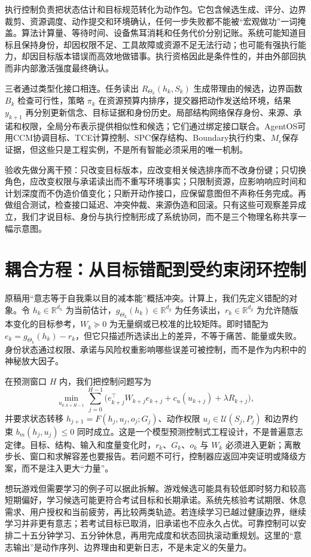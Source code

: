 执行控制负责把状态估计和目标规范转化为动作包。它包含候选生成、评分、边界裁剪、资源调度、动作提交和环境确认，任何一步失败都不能被“宏观做功”一词掩盖。算法计算量、等待时间、设备焦耳消耗和任务代价分别记账。系统可能知道目标且保持身份，却因权限不足、工具故障或资源不足无法行动；也可能有强执行能力，却因目标版本错误而高效地做错事。执行资格因此是条件性的，并由外部回执而非内部激活强度最终确认。

三者通过类型化接口相连。任务读出 $R_{\Theta_k}(h_k,S_k)$ 生成带理由的候选，边界函数 $B_k$ 检查可行性，策略 $\pi_k$ 在资源预算内排序，提交器把动作发送给环境，结果 $y_{k+1}$ 再分别更新信念、目标证据和身份历史。局部结构网络保存身份、来源、承诺和权限，全局分布表示提供相似性和候选；它们通过绑定接口联合。AgentOS可用CCM协调目标、TCE计算控制、SPC保存结构、Boundary执行约束、$M_e$保存证据，但这些只是工程实例，不是所有智能必须采用的唯一机制。

验收先做分离干预：只改变目标版本，应改变相关候选排序而不改身份键；只切换角色，应改变权限与承诺读出而不重写环境事实；只限制资源，应影响响应时间和计划深度而不伪造价值变化；只断开动作接口，应保留意图但不声称任务完成。再做组合测试，检查接口延迟、冲突仲裁、来源伪造和回滚。只有这些可观察差异成立，我们才说目标、身份与执行控制形成了系统协同，而不是三个物理名称共享一幅示意图。

\section{耦合方程：从目标错配到受约束闭环控制}
\label{sec:section_4740}
原稿用“意志等于自我乘以目的减本能”概括冲突。计算上，我们先定义错配的对象。令 $h_k\in\mathbb R^{d_h}$ 为当前估计，$g_{\Theta_k}(h_k)\in\mathbb R^{d_g}$ 为任务读出，$r_k\in\mathbb R^{d_g}$ 为允许随版本变化的目标参考，$W_k\succeq0$ 为无量纲或已校准的比较矩阵。即时错配为 $e_k=g_{\Theta_k}(h_k)-r_k$，但它只描述所选读出上的差异，不等于痛苦、能量或失败。身份状态通过权限、承诺与风险权重影响哪些误差可被控制，而不是作为内积中的神秘放大因子。

在预测窗口 $H$ 内，我们把控制问题写为
\[
\min_{u_{k:k+H-1}}\sum_{j=0}^{H-1}
\bigl(e_{k+j}^{\top}W_{k+j}e_{k+j}+c_u(u_{k+j})+\lambda R_{k+j}\bigr),
\]
并要求状态转移 $h_{j+1}=F(h_j,u_j,o_j;G_j)$、动作权限 $u_j\in\mathcal U(S_j,P_j)$ 和边界约束 $b_m(h_j,u_j)\leq0$ 同时成立。这是一个模型预测控制式工程设计，不是普遍意志定律。目标、结构、输入和度量变化时，$r_k$、$G_k$、$o_k$ 与 $W_k$ 必须进入更新；离散步长、窗口和求解容差也要报告。若问题不可行，控制器应返回冲突证明或降级方案，而不是注入更大“力量”。

想玩游戏但需要学习的例子可以据此拆解。游戏候选可能具有较低即时努力和较高短期偏好，学习候选可能更符合考试目标和长期承诺。系统先核验考试期限、休息需求、用户授权和当前疲劳，再比较两类轨迹。若连续学习已越过健康边界，继续学习并非更有意志；若考试目标已取消，旧承诺也不应永久占优。可靠控制可以安排二十五分钟学习、五分钟休息，再用完成度和状态回执滚动重规划。这里的“意志输出”是动作序列、边界理由和更新日志，不是未定义的矢量力。

